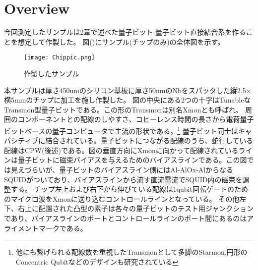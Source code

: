 \section{Overview}
    今回測定したサンプルは2章で述べた量子ビット-量子ビット直接結合系を作ることを想定して作製した。
    図()にサンプル(チップのみ)の全体図を示す。
    \begin{figure}[H]
        \begin{center}
            \texttt{[image: Chippic.png]}
            \caption{作製したサンプル}
        \end{center}
    \end{figure}
    本サンプルは厚さ450umのシリコン基板に厚さ50nmのNbをスパッタした縦2.5$\times$横5mmのチップに加工を施し作製した。
    図の中央にある2つの十字はTunableなTransmon型量子ビットである。この形のTransmonは別名Xmon\cite{barends2013coherent}とも呼ばれ、
    周囲のコンポーネントとの配線のしやすさ、コヒーレンス時間の長さから電荷量子ビットベースの量子コンピュータで主流の形状である。\footnote{他にも繋げられる配線数を重視したTransmonとして多脚のStarmon,円形のConcentric Qubitなどのデザインも研究されている}
    量子ビット同士はキャパシティブに結合されている。量子ビットにつながる配線のうち、蛇行している配線はCPW(後述)である。図の垂直方向にXmonに向かって配線されているラインは量子ビットに磁束バイアスを与えるためのバイアスラインである。この図では見えづらいが、量子ビットのバイアスライン側にはAl-AlOx-AlからなるSQUIDがついており、バイアスラインから流す直流電流でSQUID内の磁束を調整する。
    チップ左上および右下から伸びている配線は1qubit回転ゲートのためのマイクロ波をXmonに送り込むコントロールラインとなっている。
    その他左下、右上に配置された凸型の素子は各々の量子ビットのテスト用ジャンクションであり、バイアスラインのポートとコントロールラインのポート間にあるのはアライメントマークである。
